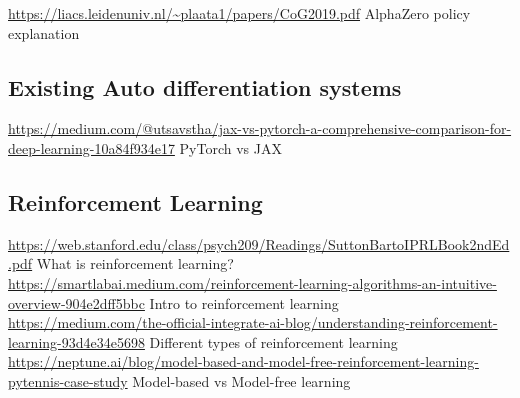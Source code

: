 \documentclass{article}
\begin{document}
    \noindent \url{https://liacs.leidenuniv.nl/~plaata1/papers/CoG2019.pdf}
    AlphaZero policy explanation

    \subsection{Existing Auto differentiation systems}
    \noindent \url{https://medium.com/@utsavstha/jax-vs-pytorch-a-comprehensive-comparison-for-deep-learning-10a84f934e17}
    PyTorch vs JAX

    \subsection{Reinforcement Learning}
    \noindent \url{https://web.stanford.edu/class/psych209/Readings/SuttonBartoIPRLBook2ndEd.pdf} What is reinforcement learning?\\
    \noindent \url{https://smartlabai.medium.com/reinforcement-learning-algorithms-an-intuitive-overview-904e2dff5bbc} Intro to reinforcement learning\\
    \noindent \url{https://medium.com/the-official-integrate-ai-blog/understanding-reinforcement-learning-93d4e34e5698} Different types of reinforcement learning\\
    \noindent \url{https://neptune.ai/blog/model-based-and-model-free-reinforcement-learning-pytennis-case-study} Model-based vs Model-free learning\\
\end{document}
